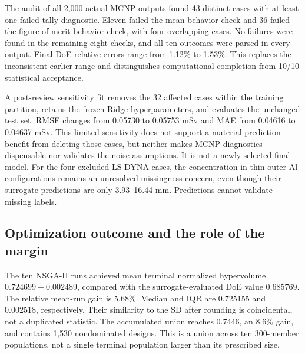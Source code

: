The audit of all 2,000 actual MCNP outputs found 43 distinct cases with at least one failed tally diagnostic. Eleven failed the mean-behavior check and 36 failed the figure-of-merit behavior check, with four overlapping cases. No failures were found in the remaining eight checks, and all ten outcomes were parsed in every output. Final DoE relative errors range from 1.12\% to 1.53\%. This replaces the inconsistent earlier range and distinguishes computational completion from 10/10 statistical acceptance.

A post-review sensitivity fit removes the 32 affected cases within the training partition, retains the frozen Ridge hyperparameters, and evaluates the unchanged test set. RMSE changes from 0.05730 to 0.05753 mSv and MAE from 0.04616 to 0.04637 mSv. This limited sensitivity does not support a material prediction benefit from deleting those cases, but neither makes MCNP diagnostics dispensable nor validates the noise assumptions. It is not a newly selected final model. For the four excluded LS-DYNA cases, the concentration in thin outer-Al configurations remains an unresolved missingness concern, even though their surrogate predictions are only 3.93--16.44 mm. Predictions cannot validate missing labels.

\subsection{Optimization outcome and the role of the margin}
The ten NSGA-II runs achieved mean terminal normalized hypervolume $0.724699\pm0.002489$, compared with the surrogate-evaluated DoE value 0.685769. The relative mean-run gain is 5.68\%. Median and IQR are 0.725155 and 0.002518, respectively. Their similarity to the SD after rounding is coincidental, not a duplicated statistic. The accumulated union reaches 0.7446, an 8.6\% gain, and contains 1,530 nondominated designs. This is a union across ten 300-member populations, not a single terminal population larger than its prescribed size.

